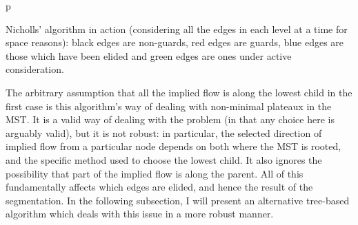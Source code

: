 \begin{stusubfig}{p}
	\hspace{4mm}%
	\hspace{4mm}%
\caption{Nicholls' algorithm in action (considering all the edges in each level at a time for space reasons): black edges are non-guards, red edges are guards, blue edges are those which have been elided and green edges are ones under active consideration.}
\label{fig:segmentation-waterfall-nicholls-example}
\end{stusubfig}

The arbitrary assumption that all the implied flow is along the lowest child in the first case is this algorithm's way of dealing with non-minimal plateaux in the MST. It is a valid way of dealing with the problem (in that any choice here is arguably valid), but it is not robust: in particular, the selected direction of implied flow from a particular node depends on both where the MST is rooted, and the specific method used to choose the lowest child. It also ignores the possibility that part of the implied flow is along the parent. All of this fundamentally affects which edges are elided, and hence the result of the segmentation. In the following subsection, I will present an alternative tree-based algorithm which deals with this issue in a more robust manner.

